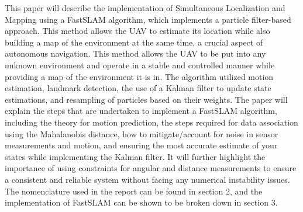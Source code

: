 This paper will describe the implementation of Simultaneous Localization and Mapping using a FastSLAM algorithm, which implements a particle filter-based approach. This method allows the UAV to estimate its location while also building a map of the environment at the same time, a crucial aspect of autonomous navigation. This method allows the UAV to be put into any unknown environment and operate in a stable and controlled manner while providing a map of the environment it is in. The algorithm utilized motion estimation, landmark detection, the use of a Kalman filter to update state estimations, and resampling of particles based on their weights. The paper will explain the steps that are undertaken to implement a FastSLAM algorithm, including the theory for motion prediction, the steps required for data association using the Mahalanobis distance, how to mitigate/account for noise in sensor measurements and motion, and ensuring the most accurate estimate of your states while implementing the Kalman filter. It will further highlight the importance of using constraints for angular and distance measurements to ensure a consistent and reliable system without facing any numerical instability issues. The nomenclature used in the report can be found in section 2, and the implementation of FastSLAM can be shown to be broken down in section 3.
